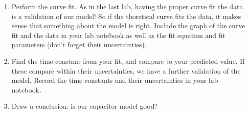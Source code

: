 {\begin{enumerate}
\item Perform the curve fit. As in the last lab, having the proper curve fit
the data is a validation of our model! So if the thoretical curve fits the
data, it makes sense that something about the model is right. Include the
graph of the curve fit and the data in your lab notebook as well as the fit
equation and fit parameters (don't forget their uncertainties).

\item Find the time constant from your fit, and compare to your 
	predicted value. If these
compare within their uncertainties, we have a further validation of the
model. Record the time constants and their uncertainties in your lab
notebook.

\item Draw a conclusion: is our capacitor model good?
\end{enumerate}
}
